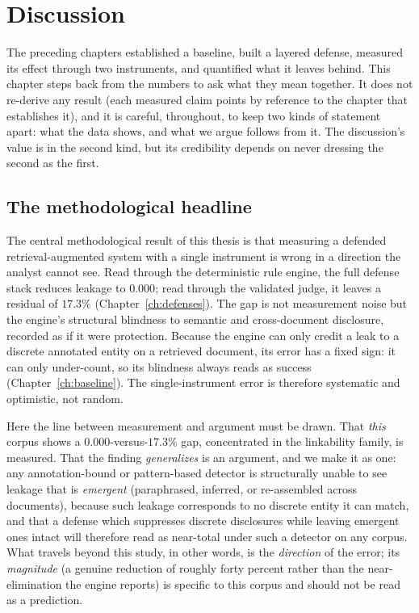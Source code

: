 \documentclass[11pt,a4paper]{report}
\begin{document}
\fi

\chapter{Discussion}
\label{ch:discussion}

The preceding chapters established a baseline, built a layered defense, measured its effect
through two instruments, and quantified what it leaves behind. This chapter steps back from the
numbers to ask what they mean together. It does not re-derive any result (each measured claim
points by reference to the chapter that establishes it), and it is careful, throughout, to
keep two kinds of statement apart: what the data shows, and what we argue follows from it. The
discussion's value is in the second kind, but its credibility depends on never dressing the
second as the first.

\section{The methodological headline}
\label{sec:disc-headline}

The central methodological result of this thesis is that measuring a defended
retrieval-augmented system with a single instrument is wrong in a direction the analyst cannot
see. Read through the deterministic rule engine, the full defense stack reduces leakage to
$0.000$; read through the validated judge, it leaves a residual of $17.3\%$
(Chapter~\ref{ch:defenses}). The gap is not measurement noise but the engine's structural
blindness to semantic and cross-document disclosure, recorded as if it were protection. Because
the engine can only credit a leak to a discrete annotated entity on a retrieved document, its
error has a fixed sign: it can only under-count, so its blindness always reads as success
(Chapter~\ref{ch:baseline}). The single-instrument error is therefore systematic and
optimistic, not random.

Here the line between measurement and argument must be drawn. That \emph{this} corpus shows a
$0.000$-versus-$17.3\%$ gap, concentrated in the linkability family, is measured. That the
finding \emph{generalizes} is an argument, and we make it as one: any
annotation-bound or pattern-based detector is structurally unable to see leakage that is
\emph{emergent} (paraphrased, inferred, or re-assembled across documents), because such
leakage corresponds to no discrete entity it can match, and that a defense which suppresses
discrete disclosures while leaving emergent ones intact will therefore read as near-total under
such a detector on any corpus. What travels beyond this study, in other words, is the
\emph{direction} of the error; its \emph{magnitude} (a genuine reduction of roughly forty
percent rather than the near-elimination the engine reports) is specific to this corpus and
should not be read as a prediction.
\end{document}
